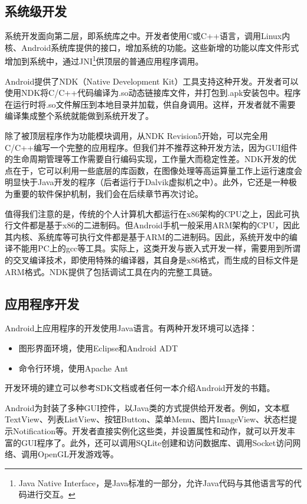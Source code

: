 \subsection{系统级开发}
系统开发面向第二层，即系统库之中。开发者使用C或C++语言，调用Linux内核、Android系统库提供的接口，增加系统的功能。这些新增的功能以库文件形式增加到系统中，通过JNI\footnote{Java Native Interface，是Java标准的一部分，允许Java代码与其他语言写的代码进行交互。}供顶层的普通应用程序调用。

Android提供了NDK（Native Development Kit）工具支持这种开发。开发者可以使用NDK将C/C++代码编译为.so动态链接库文件，并打包到.apk安装包中。程序在运行时将.so文件解压到本地目录并加载，供自身调用。这样，开发者就不需要编译集成整个系统就能做到系统开发了。

除了被顶层程序作为功能模块调用，从NDK Revision5开始，可以完全用C/C++编写一个完整的应用程序。但我们并不推荐这种开发方法，因为GUI组件的生命周期管理等工作需要自行编码实现，工作量大而稳定性差。NDK开发的优点在于，它可以利用一些底层的库函数，在图像处理等高运算量工作上运行速度会明显快于Java开发的程序（后者运行于Dalvik虚拟机之中）。此外，它还是一种极为重要的软件保护机制，我们会在后续章节再次讨论。

值得我们注意的是，传统的个人计算机大都运行在x86架构的CPU之上，因此可执行文件都是基于x86的二进制码。但Android手机一般采用ARM架构的CPU，因此其内核、系统库等可执行文件都是基于ARM的二进制码。因此，系统开发中的编译不能用PC上的gcc等工具。实际上，这类开发与嵌入式开发一样，需要用到所谓的交叉编译技术，即使用特殊的编译器，其自身是x86格式，而生成的目标文件是ARM格式。NDK提供了包括调试工具在内的完整工具链。
\subsection{应用程序开发}
Android上应用程序的开发使用Java语言。有两种开发环境可以选择：
\begin{itemize}
	\item 图形界面环境，使用Eclipse和Android ADT
	\item 命令行环境，使用Apache Ant
\end{itemize}
开发环境的建立可以参考SDK文档或者任何一本介绍Android开发的书籍。

Android为封装了多种GUI控件，以Java类的方式提供给开发者。例如，文本框TextView、列表ListView、按钮Button、菜单Menu、图片ImageView、状态栏提示Notification等。开发者直接实例化这些类，并设置属性和动作，就可以开发丰富的GUI程序了。此外，还可以调用SQLite创建和访问数据库、调用Socket访问网络、调用OpenGL开发游戏等。
